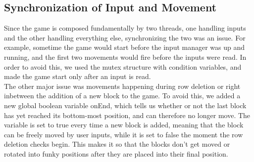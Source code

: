 	\subsection{Synchronization of Input and Movement}
		Since the game is composed fundamentally by two threads, one handling inputs and the other handling everything else, synchronizing the two was an issue. For example, sometime the game would start
		before the input manager was up and running, and the first two movements would fire before the inputs were read. In order to avoid this, we used the mutex structure with condition variables, and made
		the game start only after an input is read. \\
		The other major issue was movements happening during row deletion or right inbetween the addition of a new block to the game. To avoid this, we added a new global boolean variable onEnd, which tells us
		whether or not the last block has yet reached its bottom-most position, and can therefore no longer move. The variable is set to true every time a new block is added, meaning that the block can be freely
		moved by user inputs, while it is set to false the moment the row deletion checks begin. This makes it so that the blocks don't get moved or rotated into funky positions after they are placed into their 
		final position.